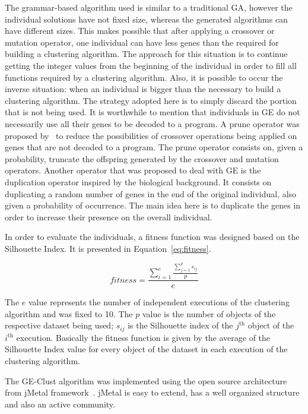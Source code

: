 \documentclass[conference]{IEEEtran}
\begin{document}
	
	The grammar-based algorithm used is similar to a traditional GA, however the individual solutions have not fixed size, whereas the generated algorithms can have different sizes. This makes possible that after applying a crossover or mutation operator, one individual can have less genes than the required for building a clustering algorithm. The approach for this situation is to continue getting the integer values from the beginning of the individual in order to fill all functions required by a clustering algorithm. Also, it is possible to occur the inverse situation: when an individual is bigger than the necessary to build a clustering algorithm. The strategy adopted here is to simply discard the portion that is not being used. It is worthwhile to mention that individuals in GE do not necessarily use all their genes to be decoded to a program. A prune operator was proposed by~\cite{ryan1998grammatical} to reduce the possibilities of crossover operations being applied on genes that are not decoded to a program. The prune operator consists on, given a probability, truncate the offspring generated by the crossover and mutation operators. Another operator that was proposed to deal with GE is the duplication operator inspired by the biological background. It consists on duplicating a random number of genes in the end of the original individual, also given a probability of occurrence. The main idea here is to duplicate the genes in order to increase their presence on the overall individual.
	
	In order to evaluate the individuals, a fitness function was designed based on the Silhouette Index. It is presented in Equation~\ref{eq:fitness}.
	
	
	\begin{equation} \label{eq:fitness}
	fitness = \frac{\sum_{i=1}^e \frac{\sum_{j=1}^{p} s_{ij}}{p}}{e}
	\end{equation}
	
	
	The $e$ value represents the number of independent executions of the clustering algorithm and was fixed to 10. The $p$ value is the number of objects of the respective dataset being used; $s_{ij}$ is the Silhouette index of the $j^{\text{th}}$ object of the $i^{\text{th}}$ execution. Basically the fitness function is given by the average of the Silhouette Index value for every object of the dataset in each execution of the clustering algorithm.
	
	
	The GE-Clust algorithm was implemented using the open source architecture from jMetal framework~\cite{durillo2011jmetal}. jMetal is easy to extend, has a well organized structure and also an active community. 
	
\end{document}
